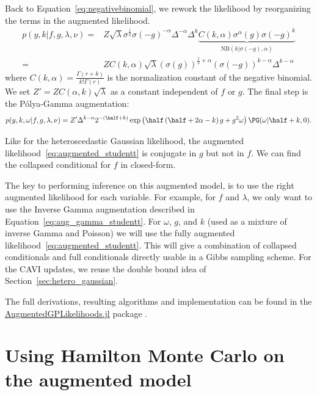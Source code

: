 Back to Equation~\eqref{eq:negativebinomial}, we rework the likelihood by reorganizing the terms in the augmented likelihood.
\begin{align*}
    p(y,k|f,g,\lambda,\nu) =& Z\sqrt{\lambda}\sigma^{\frac{1}{2}}\sigma(-g)^{-\alpha}\Delta^{-\alpha}\Delta^k\underbrace{C(k,\alpha)\sigma^{\alpha}(g)\sigma(-g)^k}_{\mathrm{NB}(k|\sigma(-g),\alpha)}\\
    =& ZC(k,\alpha)\sqrt{\lambda}(\sigma(g))^{\frac{1}{2}+\alpha}(\sigma(-g))^{k-\alpha}\Delta^{k-\alpha}
\end{align*}
where $C(k, \alpha) = \frac{\Gamma(r + k)}{k!\Gamma(r)}$ is the normalization constant of the negative binomial.
We set $Z'=ZC(\alpha,k)\sqrt{\lambda}$ as a constant independent of $f$ or $g$.
The final step is the P\'olya-Gamma augmentation:
\begin{align}
    p(y,k,\omega|f,g,\lambda,\nu) = Z'\Delta^{k-\alpha}2^{-(\half+k)}\exp\left(\half\left(\half + 2\alpha - k\right)g + g^2\omega\right)\PG(\omega|\half+k,0)\label{eq:augmented_studentt}.
\end{align}

Like for the heteroscedastic Gaussian likelihood, the augmented likelihood~\eqref{eq:augmented_studentt} is conjugate in $g$ but not in $f$.
We can find the collapsed conditional for $f$ in closed-form.

The key to performing inference on this augmented model, is to use the right augmented likelihood for each variable.
For example, for $f$ and $\lambda$, we only want to use the Inverse Gamma augmentation described in Equation~\eqref{eq:aug_gamma_studentt}.
For $\omega$, $g$, and $k$ (used as a mixture of inverse Gamma and Poisson) we will use the fully augmented likelihood~\eqref{eq:augmented_studentt}.
This will give a combination of collapsed conditionals and full conditionals directly usable in a Gibbs sampling scheme.
For the \ac{CAVI} updates, we reuse the double bound idea of Section~\ref{sec:hetero_gaussian}.

The full derivations, resulting algorithms and implementation can be found in the  \href{https://github.com/JuliaGaussianProcesses/AugmentedGPLikelihoods.jl}{AugmentedGPLikelihoods.jl} package \cite{theo_galy_fajou_2022_6347022}.

\section{Using Hamilton Monte Carlo on the augmented model}


